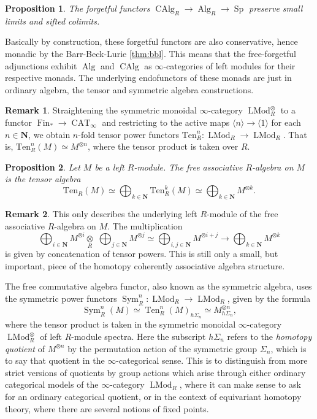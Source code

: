 \documentclass{article}
\newtheorem{proposition}{Proposition}[subsection]
\theoremstyle{definition}
\newtheorem{remark}{Remark}[subsection]
\newcommand{\NN}{\mathbf{N}}
\renewcommand{\i}{\infty}
\newcommand{\too}{\longrightarrow}
\newcommand{\n}{\langle n\rangle}
\DeclareMathOperator{\LMod}{LMod}
\DeclareMathOperator{\Alg}{Alg}
\DeclareMathOperator{\CAlg}{CAlg}
\DeclareMathOperator{\CAT}{CAT}
\DeclareMathOperator{\Fin}{Fin}
\DeclareMathOperator{\Sym}{Sym}
\DeclareMathOperator{\Sp}{Sp}
\DeclareMathOperator{\Ten}{Ten}
\begin{document}
\begin{proposition}{\em \cite[Corollaries 3.2.2.4 and 3.2.3.2]{HA}}
The forgetful functors $\CAlg_R\to\Alg_R\to\Sp$ preserve small limits and sifted colimits.
\end{proposition}


Basically by construction, these forgetful functors are also conservative, hence monadic by the Barr-Beck-Lurie \autoref{thm:bbl}.
This means that the free-forgetful adjunctions exhibit $\Alg$ and $\CAlg$ as $\i$-categories of left modules for their respective monads.
The underlying endofunctors of these monads are just in ordinary algebra, the tensor and symmetric algebra constructions.
\begin{remark}
Straightening the symmetric monoidal $\infty$-category $\LMod_R^\otimes$ to a functor $\Fin_*\to\CAT_\i$ and restricting to the active maps $\n\to\langle 1\rangle$ for each $n\in\NN$, we obtain $n$-fold tensor power functors $\mathrm{Ten}_R^n:\LMod_R\to\LMod_R$.
That is, $\mathrm{Ten}_R^n(M)\simeq M^{\otimes n}$, where the tensor product is taken over $R$.
\end{remark}
\begin{proposition}{\em \cite[Proposition 4.1.1.18]{HA}}
Let $M$ be a left $R$-module.
The free associative $R$-algebra on $M$ is the tensor algebra
\[
\mathrm{Ten}_R(M)\simeq\bigoplus_{k\in\NN}\mathrm{Ten}^k_R(M)\simeq\bigoplus_{k\in\NN} M^{\otimes k}.
\]
\end{proposition}
\begin{remark}
This only describes the underlying left $R$-module of the free associative $R$-algebra on $M$.
The multiplication
\[
\bigoplus_{i\in\NN} M^{\otimes i}\underset{R}{\otimes}\,\,\bigoplus_{j\in\NN} M^{\otimes j}\simeq\bigoplus_{i,j\in\NN} M^{\otimes i+j}\too\bigoplus_{k\in\NN} M^{\otimes k}
\]
is given by concatenation of tensor powers.
This is still only a small, but important, piece of the homotopy coherently associative algebra structure. 
\end{remark}

The free commutative algebra functor, also known as the symmetric algebra, uses the symmetric power functors $\Sym^{n}_R:\LMod_R\to\LMod_R$,\index{$\Sym^n_R$} given by the formula
\[
\Sym^n_R(M)\simeq\Ten^n_R(M)_{h\Sigma_n}\simeq M^{\otimes n}_{h\Sigma_n},
\]
where the tensor product is taken in the symmetric monoidal $\infty$-category $\LMod_R^\otimes$ of left $R$-module spectra.
Here the subscript $h\Sigma_n$ refers to the {\em homotopy quotient} of $M^{\otimes n}$ by the permutation action of the symmetric group $\Sigma_n$, which is to say that quotient in the $\infty$-categorical sense.
This is to distinguish from more strict versions of quotients by group actions which arise through either ordinary categorical models of the $\infty$-category $\LMod_R$, where it can make sense to ask for an ordinary categorical quotient, or in the context of equivariant homotopy theory, where there are several notions of fixed points.
\end{document}
